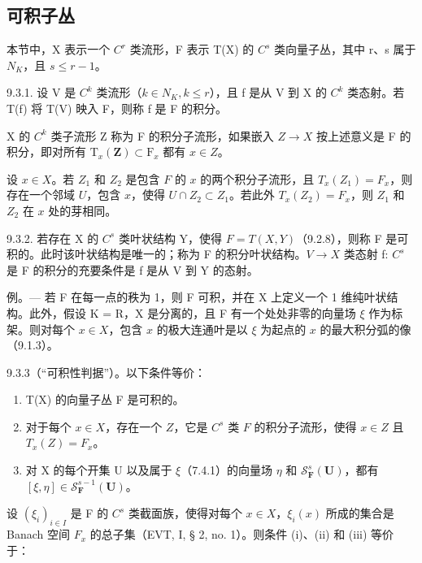 \subsection{可积子丛}

本节中，X 表示一个 \(C^{r}\) 类流形，F 表示 T(X) 的 \(C^{s}\) 类向量子丛，其中 r、s 属于 \(N_{K}\)，且 \(s \leqslant r - 1\)。

9.3.1. 设 V 是 \(C^{k}\) 类流形（\(k \in N_{K}, k \leqslant r\)），且 f 是从 V 到 X 的 \(C^{k}\) 类态射。若 T(f) 将 T(V) 映入 F，则称 f 是 F 的积分。

X 的 \(C^{k}\) 类子流形 Z 称为 F 的积分子流形，如果嵌入 \(Z \rightarrow X\) 按上述意义是 F 的积分，即对所有 \(\mathrm{T}_{x}(\mathbf{Z}) \subset \mathrm{F}_{x}\) 都有 \(x \in Z\)。

设 \(x \in X\)。若 \(Z_1\) 和 \(Z_2\) 是包含 \(F\) 的 \(x\) 的两个积分子流形，且 \(T_x(Z_1) = F_x\)，则存在一个邻域 \(U\)，包含 \(x\)，使得 \(U \cap Z_2 \subset Z_1\)。若此外 \(T_x(Z_2) = F_x\)，则 \(Z_1\) 和 \(Z_2\) 在 \(x\) 处的芽相同。

9.3.2. 若存在 X 的 \(C^{s}\) 类叶状结构 Y，使得 \(F = T(X, Y)\)（9.2.8），则称 F 是可积的。此时该叶状结构是唯一的；称为 F 的积分叶状结构。\(V \to X\) 类态射 f: \(C^{s}\) 是 F 的积分的充要条件是 f 是从 V 到 Y 的态射。

例。--- 若 F 在每一点的秩为 1，则 F 可积，并在 X 上定义一个 1 维纯叶状结构。此外，假设 K = R，X 是分离的，且 F 有一个处处非零的向量场 \(\xi\) 作为标架。则对每个 \(x \in X\)，包含 \(x\) 的极大连通叶是以 \(\xi\) 为起点的 \(x\) 的最大积分弧的像（9.1.3）。

9.3.3（“可积性判据”）。以下条件等价：

\begin{enumerate}
\def\labelenumi{(\roman{enumi})}
\item
  T(X) 的向量子丛 F 是可积的。
\item
  对于每个 \(x \in X\)，存在一个 \(Z\)，它是 \(C^s\) 类 \(F\) 的积分子流形，使得 \(x \in Z\) 且 \(T_x(Z) = F_x\)。
\item
  对 X 的每个开集 U 以及属于 \(\xi\)（7.4.1）的向量场 \(\eta\) 和 \(\mathcal{S}_{\mathbf{F}}^{s}(\mathbf{U})\)，都有 \([\xi, \eta] \in \mathcal{S}_{\mathbf{F}}^{s-1}(\mathbf{U})\)。
\end{enumerate}

设 \((\xi_{i})_{i\in I}\) 是 F 的 \(C^{s}\) 类截面族，使得对每个 \(x\in X\)，\(\xi_{i}(x)\) 所成的集合是 Banach 空间 \(F_{x}\) 的总子集（EVT, I, § 2, no. 1）。则条件 (i)、(ii) 和 (iii) 等价于：

